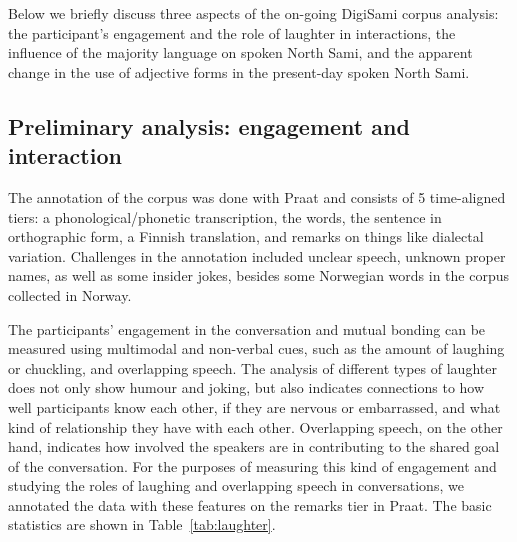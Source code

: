\documentclass[runningheads,a4paper]{llncs}
\begin{document}
Below we briefly discuss three aspects of the on-going DigiSami corpus analysis: the participant's engagement and the role of laughter in interactions, the influence of the majority language on spoken North Sami, and the apparent change in the use of adjective forms in the present-day spoken North Sami.

\subsection{Preliminary analysis: engagement and interaction}

The annotation of the corpus was done with Praat and consists of 5 time-aligned tiers: a phonological/phonetic transcription, the words, the sentence in orthographic form, a Finnish translation, and remarks on things like dialectal variation. Challenges in the annotation included unclear speech, unknown proper names, as well as some insider jokes, besides some Norwegian words in the corpus collected in Norway.

The participants' engagement in the conversation and mutual bonding can be measured using multimodal and non-verbal cues, such as the amount of laughing or chuckling, and overlapping speech. The analysis of different types of laughter does not only show humour and joking, but also indicates connections to how well participants know each other, if they are nervous or embarrassed, and what kind of relationship they have with each other. Overlapping speech, on the other hand, indicates how involved the speakers are in contributing to the shared goal of the conversation. For the purposes of measuring this kind of engagement and studying the roles of laughing and overlapping speech in conversations, we annotated the data with these features on the remarks tier in Praat. The basic statistics are shown in Table~\ref{tab:laughter}.
\end{document}
